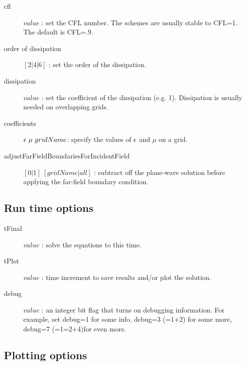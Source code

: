 \documentclass{article}
\begin{document}
\begin{description}
  \item [\qquad cfl] $value$ : set the CFL number. The schemes are usually stable to CFL=1. The default is CFL=.9.
  \item [\qquad order of dissipation] $[2|4|6]$ : set the order of the dissipation.
  \item [\qquad dissipation] $value$ : set the coefficient of the dissipation (e.g. 1). Dissipation is usually needed on overlapping grids. 
  \item [\qquad coefficients] $\epsilon~\mu~gridName$: specify the values of $\epsilon$ and $\mu$ on a grid.
  \item [\qquad adjustFarFieldBoundariesForIncidentField] $[0|1]~[gridName|all]$ : subtract off the plane-wave solution before applying the
         far-field boundary condition.
\end{description}


\subsection{Run time options} \label{sec:runTimeDialog}

\begin{description}
  \item [\qquad tFinal] $value$ : solve the equations to this time.
  \item [\qquad tPlot] $value$ : time increment to save results and/or plot the solution.
  \item [\qquad debug] $value$ : an integer bit flag that turns on debugging information. For example, set debug=1 for some info, debug=3 (=1+2) for some
    more, debug=7 (=1=2+4)for even more. 
\end{description}

\subsection{Plotting options}
\end{document}
